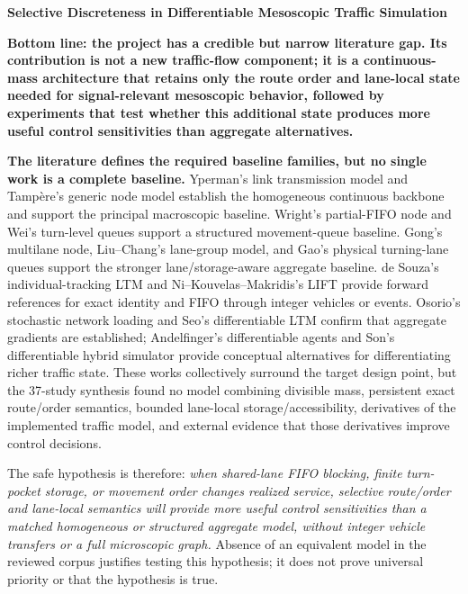 \documentclass[10pt,a4paper]{article}
\newcommand{\conclusion}[1]{\begin{center}\colorbox{bluegray}{\parbox{0.94\linewidth}{\textbf{#1}}}\end{center}}
\begin{document}
\begin{center}
{\Large\bfseries Selective Discreteness in Differentiable Mesoscopic Traffic Simulation\par}
\end{center}
\vspace{2pt}

\conclusion{Bottom line: the project has a credible but narrow literature gap. Its contribution is not a new traffic-flow component; it is a continuous-mass architecture that retains only the route order and lane-local state needed for signal-relevant mesoscopic behavior, followed by experiments that test whether this additional state produces more useful control sensitivities than aggregate alternatives.}

\textbf{The literature defines the required baseline families, but no single work is a complete baseline.} Yperman's link transmission model and Tampère's generic node model establish the homogeneous continuous backbone and support the principal macroscopic baseline. Wright's partial-FIFO node and Wei's turn-level queues support a structured movement-queue baseline. Gong's multilane node, Liu--Chang's lane-group model, and Gao's physical turning-lane queues support the stronger lane/storage-aware aggregate baseline. de Souza's individual-tracking LTM and Ni--Kouvelas--Makridis's LIFT provide forward references for exact identity and FIFO through integer vehicles or events. Osorio's stochastic network loading and Seo's differentiable LTM confirm that aggregate gradients are established; Andelfinger's differentiable agents and Son's differentiable hybrid simulator provide conceptual alternatives for differentiating richer traffic state. These works collectively surround the target design point, but the 37-study synthesis found no model combining divisible mass, persistent exact route/order semantics, bounded lane-local storage/accessibility, derivatives of the implemented traffic model, and external evidence that those derivatives improve control decisions.

The safe hypothesis is therefore: \emph{when shared-lane FIFO blocking, finite turn-pocket storage, or movement order changes realized service, selective route/order and lane-local semantics will provide more useful control sensitivities than a matched homogeneous or structured aggregate model, without integer vehicle transfers or a full microscopic graph.} Absence of an equivalent model in the reviewed corpus justifies testing this hypothesis; it does not prove universal priority or that the hypothesis is true.
\end{document}
